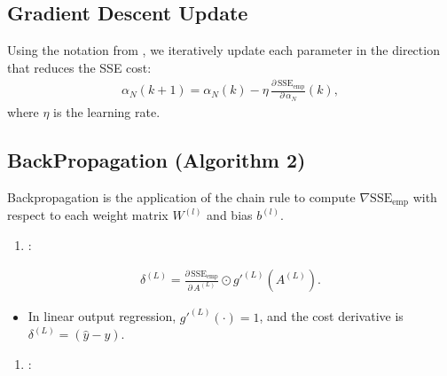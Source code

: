 \documentclass[letterpaper,10pt,english]{jupyterBook}
\begin{document}
\subsection{Gradient Descent Update}
\label{\detokenize{04:gradient-descent-update}}
\sphinxAtStartPar
Using the notation from , we iteratively update each parameter in the direction that reduces the SSE cost:
\begin{equation*}
\begin{split}
\alpha_N(k+1) = \alpha_N(k) - \eta\, \frac{\partial\,\mathrm{SSE}_{\mathrm{emp}}}{\partial\,\alpha_N}(k),
\end{split}
\end{equation*}
\sphinxAtStartPar
where \(\eta\) is the learning rate.


\subsection{Back\sphinxhyphen{}Propagation (Algorithm 2)}
\label{\detokenize{04:back-propagation-algorithm-2}}
\sphinxAtStartPar
Back\sphinxhyphen{}propagation is the application of the chain rule to compute \(\nabla \mathrm{SSE}_{\mathrm{emp}}\) with respect to each weight matrix \(W^{(l)}\) and bias \(b^{(l)}\).
\begin{enumerate}
%
\item {} 
\sphinxAtStartPar
{}:

\end{enumerate}
\begin{equation*}
\begin{split}
\delta^{(L)} = \frac{\partial\,\mathrm{SSE}_{\mathrm{emp}}}{\partial\,A^{(L)}} \odot g'^{(L)}(A^{(L)}).
\end{split}
\end{equation*}\begin{itemize}
\item {} 
\sphinxAtStartPar
In linear output regression, \(g'^{(L)}(\cdot) = 1\), and the cost derivative is \(\delta^{(L)} = (\hat{y}-y).\)

\end{itemize}
\begin{enumerate}
%
\setcounter{enumi}{1}
\item {} 
\sphinxAtStartPar
{}:

\end{enumerate}
\end{document}
